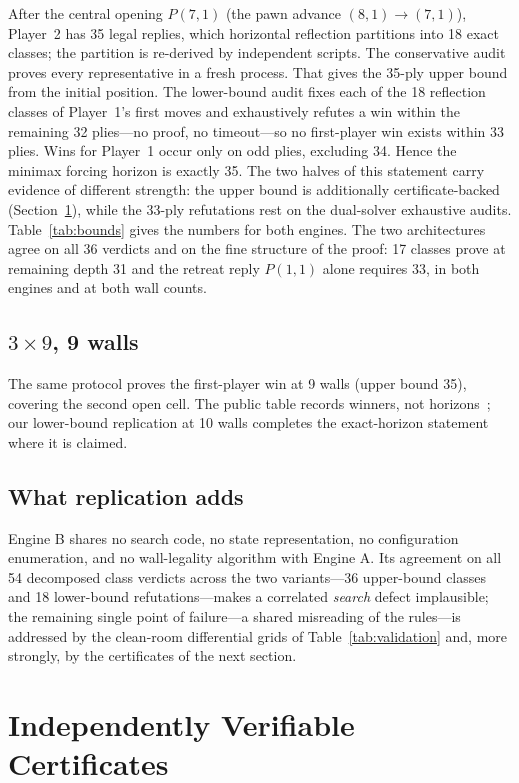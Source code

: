 \documentclass[conference]{IEEEtran}
\begin{document}
After the central opening $P(7,1)$ (the pawn advance $(8,1)\!\to\!(7,1)$), Player~2 has 35 legal replies, which horizontal reflection partitions into 18 exact classes; the partition is re-derived by independent scripts. The conservative audit proves every representative in a fresh process. That gives the 35-ply upper bound from the initial position. The lower-bound audit fixes each of the 18 reflection classes of Player~1's first moves and exhaustively refutes a win within the remaining 32 plies---no proof, no timeout---so no first-player win exists within 33 plies. Wins for Player~1 occur only on odd plies, excluding 34. Hence the minimax forcing horizon is exactly 35. The two halves of this statement carry evidence of different strength: the upper bound is additionally certificate-backed (Section~\ref{sec:cert}), while the 33-ply refutations rest on the dual-solver exhaustive audits. Table~\ref{tab:bounds} gives the numbers for both engines. The two architectures agree on all 36 verdicts and on the fine structure of the proof: 17 classes prove at remaining depth 31 and the retreat reply $P(1,1)$ alone requires 33, in both engines and at both wall counts.

\subsection{$3\times 9$, 9 walls}

The same protocol proves the first-player win at 9 walls (upper bound 35), covering the second open cell. The public table records winners, not horizons~\cite{slatton2026solving}; our lower-bound replication at 10 walls completes the exact-horizon statement where it is claimed.

\subsection{What replication adds}

Engine B shares no search code, no state representation, no configuration enumeration, and no wall-legality algorithm with Engine A. Its agreement on all 54 decomposed class verdicts across the two variants---36 upper-bound classes and 18 lower-bound refutations---makes a correlated \emph{search} defect implausible; the remaining single point of failure---a shared misreading of the rules---is addressed by the clean-room differential grids of Table~\ref{tab:validation} and, more strongly, by the certificates of the next section.

\section{Independently Verifiable Certificates}
\label{sec:cert}
\end{document}
